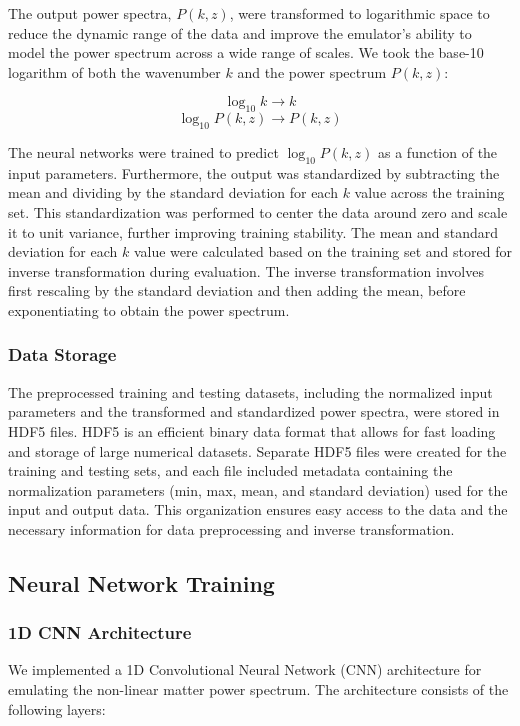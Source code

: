 \documentclass[twocolumn]{aastex631}
\begin{document}
The output power spectra, $P(k, z)$, were transformed to logarithmic space to reduce the dynamic range of the data and improve the emulator's ability to model the power spectrum across a wide range of scales. We took the base-10 logarithm of both the wavenumber $k$ and the power spectrum $P(k, z)$:

$$\log_{10} k \rightarrow k$$
$$\log_{10} P(k, z) \rightarrow P(k, z)$$

The neural networks were trained to predict $\log_{10} P(k, z)$ as a function of the input parameters. Furthermore, the output was standardized by subtracting the mean and dividing by the standard deviation for each $k$ value across the training set. This standardization was performed to center the data around zero and scale it to unit variance, further improving training stability. The mean and standard deviation for each $k$ value were calculated based on the training set and stored for inverse transformation during evaluation. The inverse transformation involves first rescaling by the standard deviation and then adding the mean, before exponentiating to obtain the power spectrum.

\subsubsection{Data Storage}

The preprocessed training and testing datasets, including the normalized input parameters and the transformed and standardized power spectra, were stored in HDF5 files. HDF5 is an efficient binary data format that allows for fast loading and storage of large numerical datasets. Separate HDF5 files were created for the training and testing sets, and each file included metadata containing the normalization parameters (min, max, mean, and standard deviation) used for the input and output data. This organization ensures easy access to the data and the necessary information for data preprocessing and inverse transformation.

\subsection{Neural Network Training}

\subsubsection{1D CNN Architecture}

We implemented a 1D Convolutional Neural Network (CNN) architecture for emulating the non-linear matter power spectrum. The architecture consists of the following layers:
\end{document}
